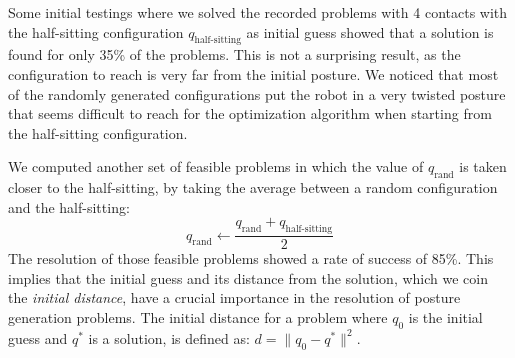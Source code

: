 Some initial testings where we solved the recorded problems with 4 contacts with the half-sitting configuration $q_\text{half-sitting}$ as initial guess showed that a solution is found for only 35\% of the problems.
This is not a surprising result, as the configuration to reach is very far from the initial posture.
We noticed that most of the randomly generated configurations put the robot in a very twisted posture that seems difficult to reach for the optimization algorithm when starting from the half-sitting configuration.


We computed another set of feasible problems in which the value of $q_\text{rand}$ is taken closer to the half-sitting, by taking the average between a random configuration and the half-sitting:
\begin{equation}
  q_\text{rand} \leftarrow \frac{q_\text{rand}+q_\text{half-sitting}}{2}
\end{equation}
The resolution of those feasible problems showed a rate of success of 85\%.
This implies that the initial guess and its distance from the solution, which we coin the \emph{initial distance}, have a crucial importance in the resolution of posture generation problems.
The initial distance for a problem where $q_0$ is the initial guess and $q^*$ is a solution, is defined as: $d=\|q_0-q^*\|^2$.


